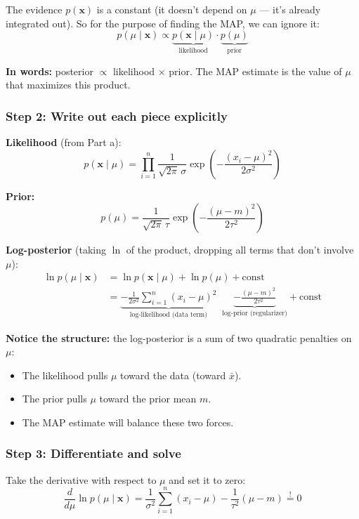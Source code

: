 \documentclass[11pt]{article}
\begin{document}
The evidence $p(\mathbf{x})$ is a constant (it doesn't depend on $\mu$ --- it's already integrated out). So for the purpose of finding the MAP, we can ignore it:
\[
  p(\mu \mid \mathbf{x}) \propto \underbrace{p(\mathbf{x} \mid \mu)}_{\text{likelihood}} \cdot \underbrace{p(\mu)}_{\text{prior}}
\]

\textbf{In words:} posterior $\propto$ likelihood $\times$ prior. The MAP estimate is the value of $\mu$ that maximizes this product.

\subsubsection*{Step 2: Write out each piece explicitly}

\textbf{Likelihood} (from Part a):
\[
  p(\mathbf{x} \mid \mu) = \prod_{i=1}^n \frac{1}{\sqrt{2\pi}\,\sigma}\exp\!\left(-\frac{(x_i - \mu)^2}{2\sigma^2}\right)
\]

\textbf{Prior:}
\[
  p(\mu) = \frac{1}{\sqrt{2\pi}\,\tau}\exp\!\left(-\frac{(\mu - m)^2}{2\tau^2}\right)
\]

\textbf{Log-posterior} (taking $\ln$ of the product, dropping all terms that don't involve $\mu$):
\begin{align*}
  \ln p(\mu \mid \mathbf{x}) &= \ln p(\mathbf{x} \mid \mu) + \ln p(\mu) + \text{const} \\[6pt]
  &= \underbrace{-\frac{1}{2\sigma^2}\sum_{i=1}^n(x_i - \mu)^2}_{\text{log-likelihood (data term)}} \;\;\underbrace{- \frac{(\mu - m)^2}{2\tau^2}}_{\text{log-prior (regularizer)}} + \text{const}
\end{align*}

\textbf{Notice the structure:} the log-posterior is a sum of two quadratic penalties on $\mu$:
\begin{itemize}
  \item The likelihood pulls $\mu$ toward the data (toward $\bar{x}$).
  \item The prior pulls $\mu$ toward the prior mean $m$.
  \item The MAP estimate will balance these two forces.
\end{itemize}

\subsubsection*{Step 3: Differentiate and solve}

Take the derivative with respect to $\mu$ and set it to zero:
\[
  \frac{d}{d\mu}\ln p(\mu \mid \mathbf{x}) = \frac{1}{\sigma^2}\sum_{i=1}^n(x_i - \mu) - \frac{1}{\tau^2}(\mu - m) \stackrel{!}{=} 0
\]
\end{document}
